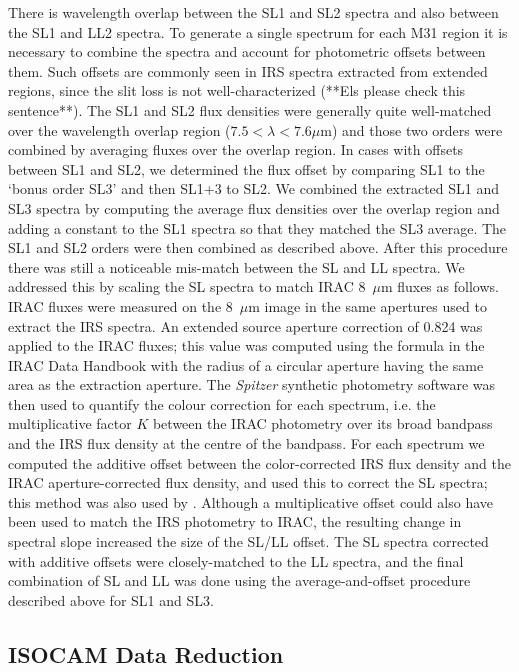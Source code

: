 There is wavelength overlap between the SL1 and SL2 spectra and also between the SL1 and LL2 spectra.
To generate a single spectrum for each M31 region it is necessary to combine the spectra and
account for photometric offsets between them. Such offsets are commonly seen in IRS spectra extracted
from extended regions, since the slit loss is not well-characterized (**Els please check this sentence**).
The SL1 and SL2 flux densities were
generally quite well-matched over the wavelength overlap region ($7.5 < \lambda< 7.6\mu$m)
and those two orders were combined by averaging fluxes over the  overlap region.
In cases with offsets between SL1 and SL2, we determined the flux offset by comparing  SL1 to the `bonus order SL3' 
and then SL1+3 to SL2. We  combined the extracted SL1 and SL3 
spectra by computing the average flux densities over the  overlap region and
adding a constant  to the SL1 spectra so that they matched the SL3 average. The SL1 and SL2 orders
were then combined as described above.
After this procedure there was still a noticeable mis-match between the SL and LL spectra. We addressed this
by scaling the SL spectra to match IRAC 8~$\mu$m fluxes as follows. IRAC fluxes were measured
on the 8~$\mu$m image \citep{Barmby2006lr} in the same apertures used to extract the IRS spectra.
An extended source  aperture correction of 0.824 was applied to the IRAC fluxes; this value was computed 
using the formula in the IRAC Data Handbook \citep{} with
the radius of a circular aperture having the same area as the extraction aperture.
The {\em Spitzer} synthetic photometry software \citep{SpitzerDAC} 
was then used to quantify the colour correction for each spectrum, i.e. the
multiplicative factor $K$ between the IRAC photometry over its broad bandpass and the IRS flux
density at the centre of the bandpass.  For each spectrum we computed the additive
offset between the color-corrected IRS flux density and the IRAC aperture-corrected flux density,
and used this to correct the SL spectra; this method was also used by \citet{Sandstrom12}.
Although a multiplicative offset could also have been used to match the IRS photometry to IRAC,
the resulting change in spectral slope increased the size of the SL/LL offset.
The SL spectra corrected with additive offsets were closely-matched to the LL spectra, and the final combination
of SL and LL was done using the average-and-offset procedure described above for SL1 and SL3.



\subsection{ISOCAM Data Reduction}
\label{sect:iso_data}

